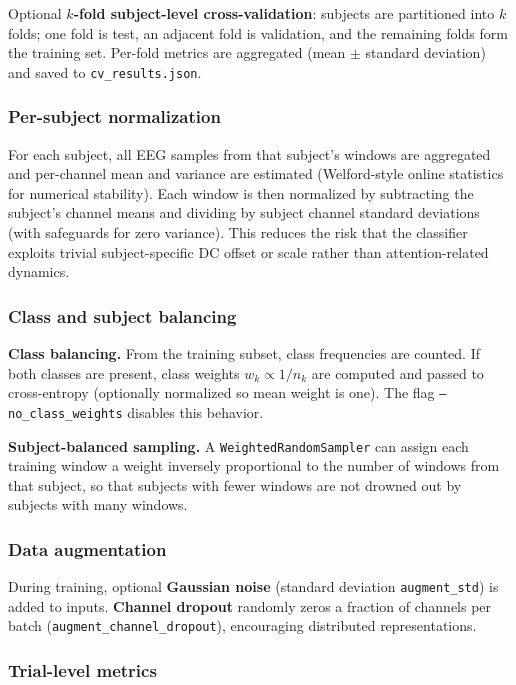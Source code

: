 \documentclass[11pt,a4paper]{article}
\newcommand{\py}[1]{\texttt{#1}}
\begin{document}
Optional \textbf{$k$-fold subject-level cross-validation}: subjects are partitioned into $k$ folds; one fold is test, an adjacent fold is validation, and the remaining folds form the training set. Per-fold metrics are aggregated (mean $\pm$ standard deviation) and saved to \py{cv\_results.json}.

\subsubsection{Per-subject normalization}
\label{sec:per_subject_norm}

For each subject, all EEG samples from that subject's windows are aggregated and per-channel mean and variance are estimated (Welford-style online statistics for numerical stability). Each window is then normalized by subtracting the subject's channel means and dividing by subject channel standard deviations (with safeguards for zero variance). This reduces the risk that the classifier exploits trivial subject-specific DC offset or scale rather than attention-related dynamics.

\subsubsection{Class and subject balancing}

\textbf{Class balancing.} From the training subset, class frequencies are counted. If both classes are present, class weights $w_k \propto 1/n_k$ are computed and passed to cross-entropy (optionally normalized so mean weight is one). The flag \texttt{--no\_class\_weights} disables this behavior.

\textbf{Subject-balanced sampling.} A \texttt{WeightedRandomSampler} can assign each training window a weight inversely proportional to the number of windows from that subject, so that subjects with fewer windows are not drowned out by subjects with many windows.

\subsubsection{Data augmentation}

During training, optional \textbf{Gaussian noise} (standard deviation \texttt{augment\_std}) is added to inputs. \textbf{Channel dropout} randomly zeros a fraction of channels per batch (\texttt{augment\_channel\_dropout}), encouraging distributed representations.

\subsubsection{Trial-level metrics}
\end{document}
